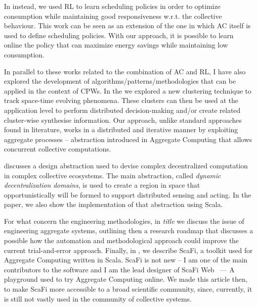\documentclass[11pt]{article}
\begin{document}
In \textit{} instead, 
 we used RL to learn scheduling policies 
 in order to optimize consumption 
 while maintaining good responsiveness w.r.t. the collective behaviour.  
This work can be seen as an extension of the one \textit{} 
 in which AC itself is used to define scheduling policies. 
With our approach, it is possible 
 to learn online the policy that can 
 maximize energy savings while maintaining low consumption.

In parallel to these works related to the combination of AC and RL, 
 I have also explored the development of algorithms/patterns/methodologies 
 that can be applied in the context of CPWs.
%
In the \textit{} 
 we explored a new clustering technique to track space-time evolving phenomena. 
% 
These clusters can then be used at the application level to perform 
 distributed decision-making and/or create related cluster-wise synthesise information.
Our approach, unlike standard approaches found in literature, 
 works in a distributed and iterative manner by exploiting 
 aggregate processes -- abstraction introduced in Aggregate Computing 
 that allows concurrent collective computations.

\textit{} discusses a design abstraction used to
 devise complex decentralized computation in complex collective ecosystems.
%
The main abstraction, called \textit{dynamic decentralization domains}, is used to
 create a region in space that opportunistically will be formed to support distributed 
 sensing and acting.
%
In the paper, we also show the implementation of that abstraction using Scala.

For what concern the engineering methodologies, in \textit{\cite{engineering}{title}}
 we discuss the issue of engineering aggregate systems, outlining then a research roadmap that discusses
 a possible how the automation and methodological approach could improve the current
 trial-and-error approach.
%
Finally, in \textit{}, we describe ScaFi, 
 a toolkit used for Aggregate Computing written in Scala.
ScaFi is not new -- I am one of the main contributors to the software and I am the lead designer of
 ScaFi Web~\cite{aguzzi2021scafi} --- A playground used to try Aggregate Computing online.
We made this article then, to make ScaFi more accessible to a broad scientific community, 
 since, currently, it is still not vastly used in the community of collective systems.
\end{document}
